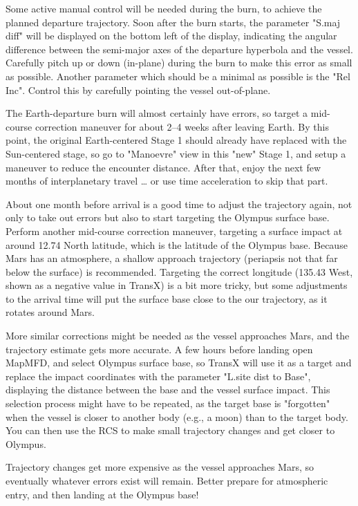 \documentclass[Orbiter User Manual.tex]{subfiles}
\begin{document}
Some active manual control will be needed during the burn, to achieve the
planned departure trajectory. Soon after the burn starts, the parameter "S.maj
diff" will be displayed on the bottom left of the display, indicating the
angular difference between the semi-major axes of the departure hyperbola and
the vessel. Carefully pitch up or down (in-plane) during the burn to make this
error as small as possible. Another parameter which should be a minimal as
possible is the "Rel Inc". Control this by carefully pointing the vessel
out-of-plane.

The Earth-departure burn will almost certainly have errors, so target a
mid-course correction maneuver for about 2--4 weeks after leaving Earth. By this
point, the original Earth-centered Stage 1 should already have replaced with the
Sun-centered stage, so go to "Manoevre" view in this "new" Stage 1, and setup a
maneuver to reduce the encounter distance. After that, enjoy the next few months
of interplanetary travel \ldots{} or use time acceleration to skip that part.

About one month before arrival is a good time to adjust the trajectory again,
not only to take out errors but also to start targeting the Olympus surface
base. Perform another mid-course correction maneuver, targeting a surface impact
at around 12.74\deg{} North latitude, which is the latitude of the Olympus base.
Because Mars has an atmosphere, a shallow approach trajectory (periapsis not
that far below the surface) is recommended. Targeting the correct longitude
(135.43\deg{} West, shown as a negative value in TransX) is a bit more tricky,
but some adjustments to the arrival time will put the surface base close to the
our trajectory, as it rotates around Mars.

More similar corrections might be needed as the vessel approaches Mars, and the
trajectory estimate gets more accurate. A few hours before landing open MapMFD,
and select Olympus surface base, so TransX will use it as a target and replace
the impact coordinates with the parameter "L.site dist to Base", displaying the
distance between the base and the vessel surface impact. This selection process
might have to be repeated, as the target base is "forgotten" when the vessel is
closer to another body (e.g., a moon) than to the target body. You can then use
the RCS to make small trajectory changes and get closer to Olympus.

Trajectory changes get more expensive as the vessel approaches Mars, so
eventually whatever errors exist will remain. Better prepare for atmospheric
entry, and then landing at the Olympus base!
\end{document}
